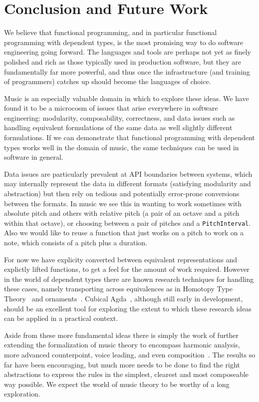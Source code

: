 \section{Conclusion and Future Work}
\label{sec:conclusion}

We believe that functional programming, and in particular functional
programming with dependent types, is the most promising way to do software
engineering going forward. The languages and tools are perhaps not yet
as finely polished and rich as those typically used in production
software, but they are fundamentally far more powerful, and thus once
the infrastructure (and training of programmers) catches up should
become the languages of choice.

Music is an especially valuable domain in which to explore these
ideas. We have found it to be a microcosm of issues that arise
everywhere in software engineering: modularity, composability,
correctness, and data issues such as handling equivalent formulations of
the same data as well slightly different formulations. If we can
demonstrate that functional programming with dependent types works
well in the domain of music, the same techniques can be used in
software in general.

Data issues are particularly prevalent at API boundaries between
systems, which may internally represent the data in different formats
(satisfying modularity and abstraction) but then rely on tedious and
potentially error-prone conversions between the formats. In music
we see this in wanting to work sometimes with absolute pitch and others
with relative pitch (a pair of an octave and a pitch within that
octave), or choosing between
a pair of pitches and a \texttt{PitchInterval}. Also we would like to
reuse a function that just works on a pitch to work on a note, which
consists of a pitch plus a duration.

For now we have explicity converted between equivalent representations
and explictly lifted functions, to get a feel for the amount of work
required.  However in the world of dependent types there are known
research techniques for handling these cases, namely transporting
across equivalences as in Homotopy Type Theory~\citep{hottbook} and
ornaments~\citep{dagand-ornaments}. Cubical
Agda~\citep{vezzosi-cubical}, although still early in development,
should be an excellent tool for exploring the extent to which these
research ideas can be applied in a practical context.

Aside from these more fundamental ideas there is simply the work of
further extending the formalization of music theory to encompass
harmonic analysis, more advanced counterpoint, voice leading, and even
composition~\citep{schoenberg-fundamentals}. The results so far have
been encouraging, but much more needs to be done to find the right
abstractions to express the rules in the simplest, clearest and most
composeable way possible.
We expect the world of music theory to be worthy of a long exploration.

